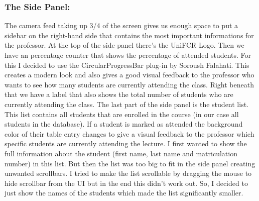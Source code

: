 \documentclass[12pt, a4paper]{article}
\begin{document}
\subsubsection{The Side Panel:}
The camera feed taking up 3/4 of the screen gives us enough space to put a sidebar on the right-hand side that contains the most important informations for the professor. At the top of the side panel there’s the UniFCR Logo. Then we have an percentage counter that shows the percentage of attended students. For this I decided to use the CircularProgressBar plug-in by Soroush Falahati. This creates a modern look and also gives a good visual feedback to the professor who wants to see how many students are currently attending the class. Right beneath that we have a label that also shows the total number of students who are currently attending the class. The last part of the side panel is the student list. This list contains all students that are enrolled in the course (in our case all students in the database). If a student is marked as attended the background color of their table entry changes to give a visual feedback to the professor which specific students are currently attending the lecture. I first wanted to show the full information about the student (first name, last name and matriculation number) in this list. But then the list was too big to fit in the side panel creating unwanted scrollbars. I tried to make the list scrollable by dragging the mouse to hide scrollbar from the UI but in the end this didn’t work out. So, I decided to just show the names of the students which made the list significantly smaller. 
\end{document}
